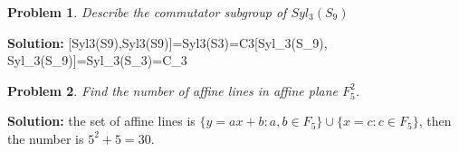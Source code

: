 \documentclass[12pt]{article}
\newtheorem{problem}{Problem}
\begin{document}
\begin{problem}
Describe the commutator subgroup of $Syl_{3}(S_{9})$
\end{problem}

\textbf{Solution:} [Syl3(S9),Syl3(S9)]=Syl3(S3)=C3[Syl_{3}(S_{9}), Syl_{3}(S_{9})]=Syl_{3}(S_{3})=C_{3}

\begin{problem}
Find the number of affine lines in affine plane $F_{5}^{2}$.
\end{problem}

\textbf{Solution:} the set of affine lines is $\{y=ax+b: a, b\in F_{5}\}\cup \{x=c: c\in F_{5}\}$, then the number is $5^2+5=30$.
\end{document}
